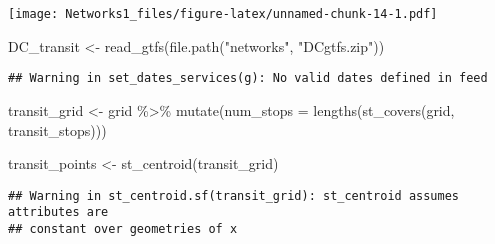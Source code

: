 \documentclass[
]{article}
\newenvironment{Shaded}{\begin{snugshade}}{\end{snugshade}}
\newcommand{\AttributeTok}[1]{\textcolor[rgb]{0.77,0.63,0.00}{#1}}
\newcommand{\FunctionTok}[1]{\textcolor[rgb]{0.00,0.00,0.00}{#1}}
\newcommand{\NormalTok}[1]{#1}
\newcommand{\OtherTok}[1]{\textcolor[rgb]{0.56,0.35,0.01}{#1}}
\newcommand{\SpecialCharTok}[1]{\textcolor[rgb]{0.00,0.00,0.00}{#1}}
\newcommand{\StringTok}[1]{\textcolor[rgb]{0.31,0.60,0.02}{#1}}
\begin{document}
\texttt{[image: Networks1\_files/figure-latex/unnamed-chunk-14-1.pdf]}

\begin{Shaded}
\begin{Highlighting}[]
\NormalTok{DC\_transit }\OtherTok{\textless{}{-}} \FunctionTok{read\_gtfs}\NormalTok{(}\FunctionTok{file.path}\NormalTok{(}\StringTok{"networks"}\NormalTok{, }\StringTok{"DCgtfs.zip"}\NormalTok{))}
\end{Highlighting}
\end{Shaded}

\begin{verbatim}
## Warning in set_dates_services(g): No valid dates defined in feed
\end{verbatim}

\begin{Shaded}
\end{Shaded}

\begin{Shaded}
\begin{Highlighting}[]
\NormalTok{transit\_grid }\OtherTok{\textless{}{-}}\NormalTok{ grid }\SpecialCharTok{\%\textgreater{}\%}
  \FunctionTok{mutate}\NormalTok{(}\AttributeTok{num\_stops =} \FunctionTok{lengths}\NormalTok{(}\FunctionTok{st\_covers}\NormalTok{(grid, transit\_stops)))}

\NormalTok{transit\_points }\OtherTok{\textless{}{-}} \FunctionTok{st\_centroid}\NormalTok{(transit\_grid)}
\end{Highlighting}
\end{Shaded}

\begin{verbatim}
## Warning in st_centroid.sf(transit_grid): st_centroid assumes attributes are
## constant over geometries of x
\end{verbatim}
\end{document}
